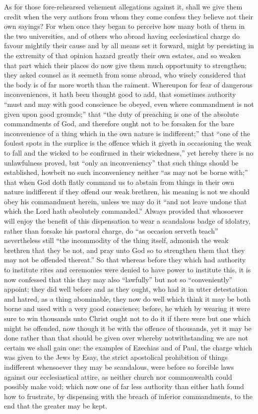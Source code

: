 As for those fore-rehearsed vehement allegations against it, shall we give them credit when the very authors from whom they come confess they believe not their own sayings? For when once they began to perceive how many both of them in the two universities, and of others who abroad having ecclesiastical charge do favour mightily their cause and by all means set it forward, might by persisting in the extremity of that opinion hazard greatly their own estates, and so weaken that part which their places do now give them much opportunity to strengthen; they asked counsel as it seemeth from some abroad, who wisely considered that the body is of far  more worth than the raiment. Whereupon for fear of dangerous inconveniences, it hath been thought good to add, that sometimes authority “must and may with good conscience be obeyed, even where commandment is not given upon good grounds;” that “the duty of preaching is one of the absolute commandments of God, and therefore ought not to be forsaken for the bare inconvenience of a thing which in the own nature is indifferent;” that “one of the foulest spots in the surplice is the offence which it giveth in occasioning the weak to fall and the wicked to be confirmed in their wickedness,” yet hereby there is no unlawfulness proved, but “only an inconveniency” that such things should be established, howbeit no such inconveniency neither “as may not be borne with;” that when God doth flatly command us to abstain from things in their own nature indifferent if they offend our weak brethren, his meaning is not we should obey his commandment herein, unless we may do it “and not leave undone that which the Lord hath absolutely  commanded.” Always provided that whosoever will enjoy the benefit of this dispensation to wear a scandalous badge of idolatry, rather than forsake his pastoral charge, do “as occasion serveth teach” nevertheless still “the incommodity of the thing itself, admonish the weak brethren that they be not, and pray unto God so to strengthen them that they may not be offended thereat.” So that whereas before they which had authority to institute rites and ceremonies were denied to have power to institute this, it is now confessed that this they may also “lawfully” but not so “conveniently” appoint; they did well before and as they ought, who had it in utter detestation and hatred, as a thing abominable, they now do well which think it may be both borne and used with a very good conscience; before, he which by wearing it were sure to win thousands unto Christ ought not to do it if there were but one which might be offended, now though it be with the offence of thousands, yet it may be done rather than that should be given over whereby notwithstanding we are not certain we shall gain one: the examples of Ezechias and of Paul, the charge which was given to the Jews by Esay, the strict apostolical prohibition of things indifferent whensoever they may be scandalous, were before so forcible laws against our ecclesiastical attire, as neither church nor commonwealth could possibly make void; which now one of far less authority than either hath found how to frustrate, by dispensing with the breach of inferior commandments, to the end that the greater may be kept.
